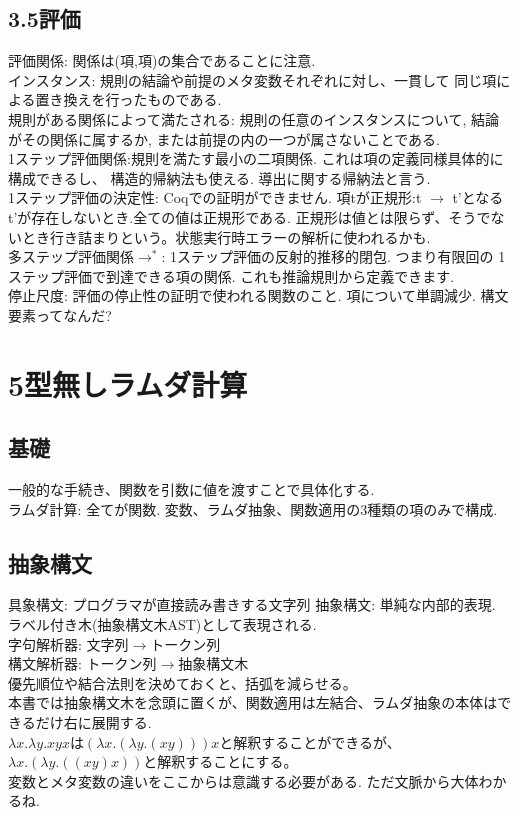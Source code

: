 \documentclass[a4paper,10pt]{article}
\begin{document}
\subsection*{3.5評価}
評価関係: 関係は(項,項)の集合であることに注意.\\
インスタンス: 規則の結論や前提のメタ変数それぞれに対し、一貫して
同じ項による置き換えを行ったものである.\\
規則がある関係によって満たされる: 規則の任意のインスタンスについて,
結論がその関係に属するか, または前提の内の一つが属さないことである.\\
1ステップ評価関係:規則を満たす最小の二項関係. これは項の定義同様具体的に構成できるし、
構造的帰納法も使える. 導出に関する帰納法と言う. \\
1ステップ評価の決定性: Coqでの証明ができません.
項tが正規形:t $\rightarrow$ t'となるt'が存在しないとき.全ての値は正規形である. 
正規形は値とは限らず、そうでないとき行き詰まりという。状態実行時エラーの解析に使われるかも. \\
多ステップ評価関係$\rightarrow^*$: 1ステップ評価の反射的推移的閉包. つまり有限回の
1ステップ評価で到達できる項の関係. これも推論規則から定義できます. \\
停止尺度: 評価の停止性の証明で使われる関数のこと. 項について単調減少.
構文要素ってなんだ?
\section*{5型無しラムダ計算}
\subsection*{基礎}
一般的な手続き、関数を引数に値を渡すことで具体化する. \\
ラムダ計算: 全てが関数. 変数、ラムダ抽象、関数適用の3種類の項のみで構成.
\subsection*{抽象構文}
具象構文: プログラマが直接読み書きする文字列
抽象構文: 単純な内部的表現. ラベル付き木(抽象構文木AST)として表現される.\\
字句解析器: 文字列$\rightarrow$トークン列\\
構文解析器: トークン列$\rightarrow$抽象構文木\\
優先順位や結合法則を決めておくと、括弧を減らせる。\\
本書では抽象構文木を念頭に置くが、関数適用は左結合、ラムダ抽象の本体はできるだけ右に展開する.\\
$\lambda x. \lambda y. x y x$は$(\lambda x. (\lambda y. (x y))) x$と解釈することができるが、
$\lambda x. (\lambda y. ((x y) x))$と解釈することにする。 \\
変数とメタ変数の違いをここからは意識する必要がある. ただ文脈から大体わかるね.
\end{document}
